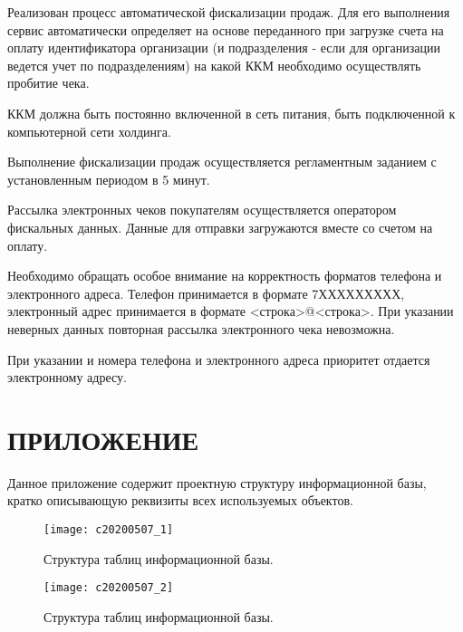 \documentclass[11pt, a4paper]{article}
\begin{document}
Реализован процесс автоматической фискализации продаж. Для его выполнения сервис автоматически определяет на основе переданного при загрузке счета на оплату идентификатора организации (и подразделения - если для организации ведется учет по подразделениям) на какой ККМ необходимо осуществлять пробитие чека.

ККМ должна быть постоянно включенной в сеть питания, быть подключенной к компьютерной сети холдинга.

Выполнение фискализации продаж осуществляется регламентным заданием с установленным периодом в 5 минут.

Рассылка электронных чеков покупателям осуществляется оператором фискальных данных. Данные для отправки загружаются вместе со счетом на оплату.

Необходимо обращать особое внимание на корректность форматов телефона и электронного адреса. Телефон принимается в формате 7ХХХХХХХХХ, электронный адрес принимается в формате <строка>@<строка>. При указании неверных данных повторная рассылка электронного чека невозможна. 

При указании и номера телефона и электронного адреса приоритет отдается электронному адресу.

\newpage
\appendix
\section{ПРИЛОЖЕНИЕ}

Данное приложение содержит проектную структуру информационной базы, кратко описывающую реквизиты всех используемых объектов.

\begin{figure}[H]
	\texttt{[image: c20200507\_1]}
	\caption{Структура таблиц информационной базы.}
\end{figure}

\begin{figure}[H]
	\texttt{[image: c20200507\_2]}
	\caption{Структура таблиц информационной базы.}
\end{figure}
\end{document}
